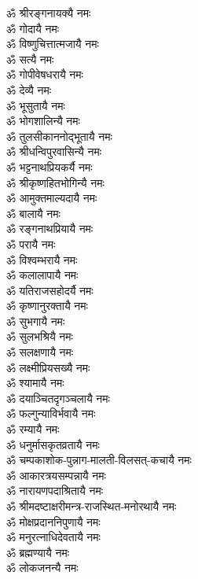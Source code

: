 \begin{multicols}{2}
\begin{flushleft}
ॐ श्रीरङ्गनायक्यै नमः\\
ॐ गोदायै नमः\\
ॐ विष्णुचित्तात्मजायै नमः\\
ॐ सत्यै नमः\\
ॐ गोपीवेषधरायै नमः\\
ॐ देव्यै नमः\\
ॐ भूसुतायै नमः\\
ॐ भोगशालिन्यै नमः\\
ॐ तुलसीकाननोद्भूतायै नमः\\
ॐ श्रीधन्विपुरवासिन्यै नमः\hfill{}\\
ॐ भट्टनाथप्रियकर्यै नमः\\
ॐ श्रीकृष्णहितभोगिन्यै नमः\\
ॐ आमुक्तमाल्यदायै नमः\\
ॐ बालायै नमः\\
ॐ रङ्गनाथप्रियायै नमः\\
ॐ परायै नमः\\
ॐ विश्वम्भरायै नमः\\
ॐ कलालापायै नमः\\
ॐ यतिराजसहोदर्यै नमः\\
ॐ कृष्णानुरक्तायै नमः\hfill{}\\
ॐ सुभगायै नमः\\
ॐ सुलभश्रियै नमः\\
ॐ सलक्षणायै नमः\\
ॐ लक्ष्मीप्रियसख्यै नमः\\
ॐ श्यामायै नमः\\
ॐ दयाञ्चितदृगञ्चलायै नमः\\
ॐ फल्गुन्याविर्भवायै नमः\\
ॐ रम्यायै नमः\\
ॐ धनुर्मासकृतव्रतायै नमः\\
ॐ चम्पकाशोक-पुन्नाग-मालती-विलसत्-कचायै नमः\hfill{}\\
ॐ आकारत्रयसम्पन्नायै नमः\\
ॐ नारायणपदाश्रितायै नमः\\
ॐ श्रीमदष्टाक्षरीमन्त्र-राजस्थित-मनोरथायै नमः\\
ॐ मोक्षप्रदाननिपुणायै नमः\\
ॐ मनुरत्नाधिदेवतायै नमः\\
ॐ ब्रह्मण्यायै नमः\\
ॐ लोकजनन्यै नमः\\

\end{flushleft}
\end{multicols}
